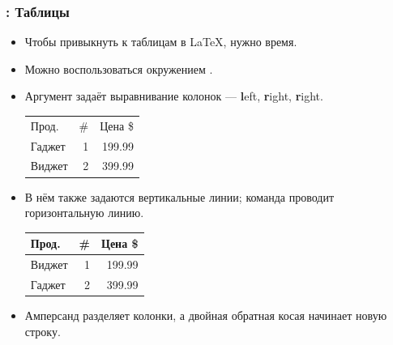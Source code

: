 \documentclass[usenames,dvipsnames]{beamer}
\begin{document}
\begin{frame}[fragile]
\frametitle{\insertsection: Таблицы}
\vspace{-3ex}
\begin{itemize}\small
\item Чтобы привыкнуть к таблицам в \LaTeX{}, нужно время.
\item Можно воспользоваться окружением .
\item Аргумент задаёт выравнивание колонок --- \textbf{l}eft, \textbf{r}ight, \textbf{r}ight.
\begin{exampletwouptiny}
\begin{tabular}{lrr}
Прод.  & \# & Цена \$ \\
Гаджет & 1  & 199.99  \\
Виджет & 2  & 399.99  \\
\end{tabular}
\end{exampletwouptiny}
\vspace{-1ex}
\item В нём также задаются вертикальные линии; команда  проводит горизонтальную линию.
\begin{exampletwouptiny}
\begin{tabular}{|l|r|r|} \hline
Прод.  & \# & Цена \$ \\\hline
Виджет & 1  & 199.99  \\
Гаджет & 2  & 399.99  \\\hline
\end{tabular}
\end{exampletwouptiny}
\item Амперсанд \keystrokebftt{\&} разделяет колонки, а двойная обратная косая
  \keystrokebftt{\bs}\keystrokebftt{\bs} начинает новую строку.
\end{itemize}
\end{frame}
\end{document}
